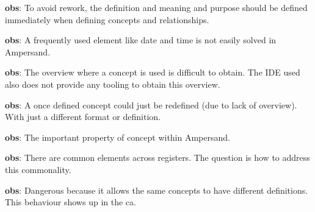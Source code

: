 \begin{obs}\label{obs:rq1-42:19-10}
    \textbf{obs}: To avoid rework, the definition and meaning and purpose should be defined immediately when defining concepts and relationships.
\end{obs}

\begin{obs}\label{obs:rq1-48:27-10}
    \textbf{obs}: A frequently used element like date and time is not easily solved in Ampersand.
\end{obs}
    
\begin{obs}\label{obs:rq1-46:24-10}
    \textbf{obs}: The {overview} where a concept is used is difficult to obtain.
    The IDE used also does not provide any tooling to obtain this overview.
\end{obs}

\begin{obs}\label{obs:rq1-80:20-11}
    \textbf{obs}: A once defined concept could just be redefined (due to lack of overview).
    With just a different format or definition.
\end{obs}
    
\begin{obs}\label{obs:rq1-84:30-11}
    \textbf{obs}: The important property of concept within Ampersand.
\end{obs}
    
\begin{obs}\label{obs:rq1-89:7-12}
    \textbf{obs}: There are common elements across registers. The question is how to address this commonality.
\end{obs}
    
\begin{obs}\label{obs:rq1-91:14-12}
    \textbf{obs}: Dangerous because it allows the same concepts to have different definitions. 
    This behaviour shows up in the \acrshort{ca}.
\end{obs}

